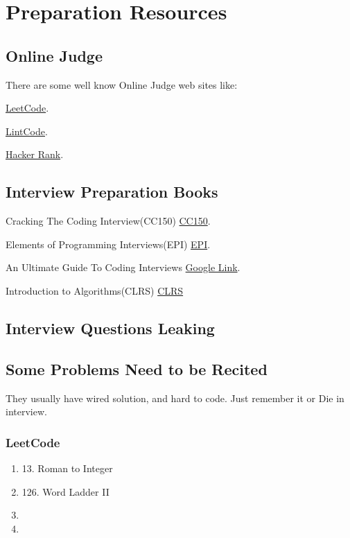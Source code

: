 \chapter{Preparation Resources}




\section{Online Judge }

There are some well know Online Judge web sites like:


\href{http://leetcode.com/problemset/}{LeetCode}.

\href{http://www.lintcode.com/en/problem/}{LintCode}.

\href{http://www.hackerrank.com/}{Hacker Rank}.

\section{Interview Preparation Books }

Cracking The Coding Interview(CC150)
\href{http://www.amazon.com/Cracking-Coding-Interview-Programming-Questions/dp/098478280X}{CC150}.

Elements of Programming Interviews(EPI)
\href{http://www.amazon.com/Elements-Programming-Interviews-Insiders-Guide/dp/1479274836}{EPI}.

An Ultimate Guide To Coding Interviews
\href{https://play.google.com/store/books/details?id=XDoVCAAAQBAJ&rdid=book-XDoVCAAAQBAJ&rdot=1&source=gbs_vpt_read&pcampaignid=books_booksearch_viewport}{Google Link}.

Introduction to Algorithms(CLRS)
\href{http://mitpress.mit.edu/books/introduction-algorithms}{CLRS}



\section{Interview Questions Leaking }



\section{Some Problems Need to be Recited }
They usually have wired solution, and hard to code. Just remember it or Die in interview. 
\subsection{ LeetCode }
\begin{enumerate}
    \item 13.   Roman to Integer
    \item 126.	Word Ladder II 
    \item  
    \item  
\end{enumerate}


